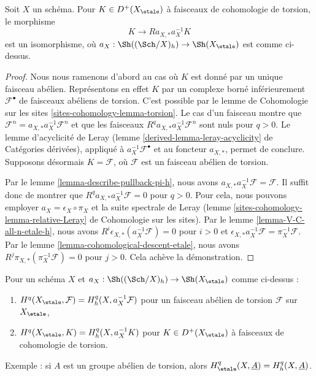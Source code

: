 \begin{lemma}
\label{lemma-cohomological-descent-etale-h}
Soit $X$ un schéma. Pour $K \in D^+(X_\etale)$ à faisceaux de cohomologie
de torsion, le morphisme
$$
K \longrightarrow Ra_{X, *}a_X^{-1}K
$$
est un isomorphisme, où $a_X : \Sh((\Sch/X)_h) \to \Sh(X_\etale)$ est comme ci-dessus.
\end{lemma}

\begin{proof}
Nous nous ramenons d'abord au cas où
$K$ est donné par un unique faisceau abélien. Représentons en effet $K$
par un complexe borné inférieurement $\mathcal{F}^\bullet$ de faisceaux
abéliens de torsion. C'est possible par le lemme de Cohomologie sur les sites
\ref{sites-cohomology-lemma-torsion}. Le cas d'un
faisceau montre que
$\mathcal{F}^n = a_{X, *} a_X^{-1} \mathcal{F}^n$
et que les faisceaux $R^qa_{X, *}a_X^{-1}\mathcal{F}^n$
sont nuls pour $q > 0$. Le lemme d'acyclicité de Leray
(lemme \ref{derived-lemma-leray-acyclicity} de Catégories dérivées),
appliqué à $a_X^{-1}\mathcal{F}^\bullet$
et au foncteur $a_{X, *}$, permet de conclure. Supposons désormais $K = \mathcal{F}$,
où $\mathcal{F}$ est un faisceau abélien de torsion.

\medskip\noindent
Par le lemme \ref{lemma-describe-pullback-pi-h}, nous avons
$a_{X, *}a_X^{-1}\mathcal{F} = \mathcal{F}$. Il suffit donc de montrer que
$R^qa_{X, *}a_X^{-1}\mathcal{F} = 0$ pour $q > 0$.
Pour cela, nous pouvons employer $a_X = \epsilon_X \circ \pi_X$ et
la suite spectrale de Leray
(lemme \ref{sites-cohomology-lemma-relative-Leray} de Cohomologie sur les sites).
Par le lemme \ref{lemma-V-C-all-n-etale-h},
nous avons $R^i\epsilon_{X, *}(a_X^{-1}\mathcal{F}) = 0$ pour $i > 0$
et $\epsilon_{X, *}a_X^{-1}\mathcal{F} = \pi_X^{-1}\mathcal{F}$.
Par le lemme \ref{lemma-cohomological-descent-etale}, nous avons
$R^j\pi_{X, *}(\pi_X^{-1}\mathcal{F}) = 0$ pour $j > 0$.
Cela achève la démonstration.
\end{proof}

\begin{lemma}
\label{lemma-compare-cohomology-etale-h}
Pour un schéma $X$ et $a_X : \Sh((\Sch/X)_h) \to \Sh(X_\etale)$
comme ci-dessus :
\begin{enumerate}
\item $H^q(X_\etale, \mathcal{F}) = H^q_h(X, a_X^{-1}\mathcal{F})$
pour un faisceau abélien de torsion $\mathcal{F}$ sur $X_\etale$,
\item $H^q(X_\etale, K) = H^q_h(X, a_X^{-1}K)$
pour $K \in D^+(X_\etale)$ à faisceaux de cohomologie de torsion.
\end{enumerate}
Exemple : si $A$ est un groupe abélien de torsion, alors
$H^q_\etale(X, \underline{A}) = H^q_h(X, \underline{A})$.
\end{lemma}

